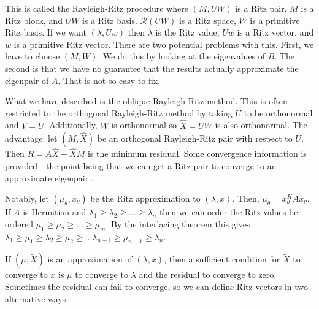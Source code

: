 \documentclass[12pt,twoside]{article}
\newcommand{\evals}{eigenvalues }
\newcommand{\cl}[1]{\ensuremath{\mathcal{#1}}}
\newcommand{\epair}{eigenpair }
\begin{document}
This is called the Rayleigh-Ritz procedure where $(M,UW)$ is a Ritz pair, $M$ is a Ritz block, and $UW$ is a Ritz basis. $\cl{R}(UW)$ is a Ritz space, $W$ is a primitive Ritz basis. If we want $(\lambda, Uw)$ then $\lambda$ is the Ritz value, $Uw$ is a Ritz vector, and $w$ is a primitive Ritz vector. There are two potential problems with this. First, we have to choose $(M,W)$. We do this by looking at the \evals of $B$. The second is that we have no guarantee that the results actually approximate the \epair of $A$. That is not so easy to fix. 

What we have described is the oblique Rayleigh-Ritz method. This is often restricted to the orthogonal Rayleigh-Ritz method by taking $U$ to be orthonormal and $V = U$. Additionally, $W$ is orthonormal so $\hat{X} = UW$ is also orthonormal. The advantage: let $(M,\hat{X})$ be an orthogonal Rayleigh-Ritz pair with respect to $U$. Then $R=A\hat{X} - \hat{X}M$ is the minimum residual. Some convergence information is provided - the point being that we can get a Ritz pair to converge to an approximate \epair. 

Notably, let $(\mu_\theta, x_\theta)$ be the Ritz approximation to $(\lambda, x)$. Then, $\mu_\theta = x_\theta^HAx_\theta$. If $A$ is Hermitian and $\lambda_1 \ge \lambda_2 \ge \dots \ge \lambda_n$ then we can order the Ritz values be ordered $\mu_1 \ge \mu_2 \ge \dots \ge \mu_m$. By the interlacing theorem this gives $\lambda_1 \ge \mu_1 \ge \lambda_2 \ge \mu_2 \ge \dots \lambda_{n-1} \ge \mu_{n-1} \ge \lambda_n$. 

If $(\mu ,\tilde{X})$ is an approximation of $(\lambda, x)$, then a sufficient condition for $\tilde{X}$ to converge to $x$ is $\mu$ to converge to $\lambda$ and the residual to converge to zero. Sometimes the residual can fail to converge, so we can define Ritz vectors in two alternative ways. 
\end{document}
